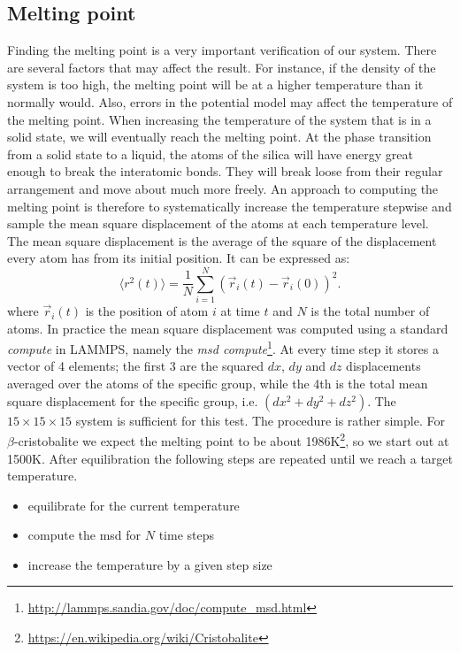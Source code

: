 \documentclass[twoside,english]{uiofysmaster}
\newcommand\lr[1]{\left(#1\right)}
\begin{document}
\subsection{Melting point}
Finding the melting point is a very important verification of our system. 
There are several factors that may affect the result. 
For instance, if the density of the system is too high, the melting point will be at a higher temperature than it normally would. 
Also, errors in the potential model may affect the temperature of the melting point. 
When increasing the temperature of the system that is in a solid state, we will eventually reach the melting point.
At the phase transition from a solid state to a liquid, the atoms of the silica will have energy great enough to break the interatomic bonds. 
They will break loose from their regular arrangement and move about much more freely. 
An approach to computing the melting point is therefore to systematically increase the temperature stepwise and sample the mean square displacement of the atoms at each temperature level.  
The mean square displacement is the average of the square of the displacement every atom has from its initial position. It can be expressed as:
\begin{equation}
\langle r^2(t)\rangle = \frac{1}{N}\sum_{i=1}^{N}\lr{\vec{r}_i(t)-\vec{r}_i(0)}^2. \label{eq: diffusion constant}
\end{equation}
where $\vec{r}_i(t)$ is the position of atom $i$ at time $t$ and $N$ is the total number of atoms. 
In practice the mean square displacement was computed using a standard \textit{compute} in LAMMPS, namely the \textit{msd compute}\footnote{\url{http://lammps.sandia.gov/doc/compute_msd.html}}. 
At every time step it stores a vector of 4 elements; the first 3 are the squared $dx$, $dy$ and $dz$ displacements averaged over the atoms of the specific group, while the 4th is the total mean square displacement for the specific group, i.e. $(dx^2 + dy^2 + dz^2)$. 
The $15\times15\times15$ system is sufficient for this test. The procedure is rather simple. For $\beta$-cristobalite we expect the melting point to be about 1986K\footnote{\url{https://en.wikipedia.org/wiki/Cristobalite}}, so we start out at 1500K. After equilibration the following steps are repeated until we reach a target temperature. 
\begin{itemize}
	\item equilibrate for the current temperature
	\item compute the msd for $N$ time steps
	\item increase the temperature by a given step size
\end{itemize}
\end{document}
